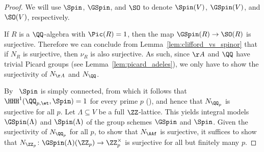 \begin{proof}
We will use $\Spin$, $\GSpin$, and $\SO$ to denote $\Spin(V)$, $\GSpin(V)$, and $\SO(V)$, respectively.

If $R$ is a $\QQ$-algebra with $\Pic(R) = 1$, then the map $\GSpin(R) \rightarrow \SO(R)$ is surjective. Therefore we can conclude from Lemma~\ref{lem:clifford_vs_spinor} that if $N_{R}$ is surjective, then $\nu_R$ is also surjective. As such, since $\AA$ and $\QQ$ have trivial Picard groups (see Lemma~\ref{lem:picard_adeles}), we only have to show the surjectivity of $N_{\AA}$ and $N_{\QQ}$.

    By~\cite[Lemma~C.4.1, Proposition~C.4.10]{ConradReductive} $\Spin$ is simply connected, from which it follows that $\HHH^1(\QQ_{p,\et},\Spin) = 1$ for every prime $p$ (\cite[Theorem~6.4]{PlatonovRapinchuk}), and hence that $N_{\QQ_p}$ is surjective for all $p$. Let $\Lambda \subseteq V$ be a full $\ZZ$-lattice. This yields integral models $\GSpin(\Lambda)$ and $\Spin(\Lambda)$ of the group schemes $\GSpin$ and $\Spin$. Given the surjectivity of $N_{\QQ_p}$ for all $p$, to show that $N_{\AAf}$ is surjective, it suffices to show that $N_{\ZZ_p}\colon \GSpin(\Lambda)(\ZZ_p) \rightarrow \ZZ_p^{\times}$ is surjective for all but finitely many $p$.


\end{proof}
